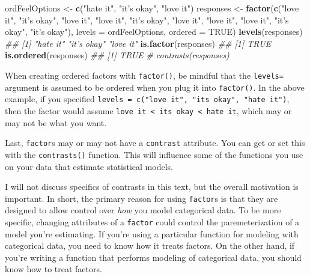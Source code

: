 \documentclass[12pt,krantz2]{krantz}
\makeatletter
\newenvironment{Shaded}{\begin{snugshade}}{\end{snugshade}}
\newcommand{\CommentTok}[1]{\textcolor[rgb]{0.37,0.37,0.37}{\textit{#1}}}
\newcommand{\DataTypeTok}[1]{\textcolor[rgb]{0.27,0.27,0.27}{#1}}
\newcommand{\KeywordTok}[1]{\textcolor[rgb]{0.27,0.27,0.27}{\textbf{#1}}}
\newcommand{\NormalTok}[1]{#1}
\newcommand{\OtherTok}[1]{\textcolor[rgb]{0.37,0.37,0.37}{#1}}
\newcommand{\StringTok}[1]{\textcolor[rgb]{0.5,0.5,0.5}{#1}}
\newenvironment{kframe}{%
\medskip{}
\setlength{\fboxsep}{.8em}
 \def\at@end@of@kframe{}%
 \ifinner\ifhmode%
  \def\at@end@of@kframe{\end{minipage}}%
  \begin{minipage}{\columnwidth}%
 \fi\fi%
 \def\FrameCommand##1{\hskip\@totalleftmargin \hskip-\fboxsep
 \colorbox{shadecolor}{##1}\hskip-\fboxsep
     \hskip-\linewidth \hskip-\@totalleftmargin \hskip\columnwidth}%
 \MakeFramed {\advance\hsize-\width
   \@totalleftmargin\z@ \linewidth\hsize
   \@setminipage}}%
 {\par\unskip\endMakeFramed%
 \at@end@of@kframe}
\renewenvironment{Shaded}{\begin{kframe}}{\end{kframe}}
\makeatother
\begin{document}
\begin{Shaded}
\begin{Highlighting}[]
\NormalTok{ordFeelOptions <-}\StringTok{ }\KeywordTok{c}\NormalTok{(}\StringTok{"hate it"}\NormalTok{, }\StringTok{"it's okay"}\NormalTok{, }\StringTok{"love it"}\NormalTok{)}
\NormalTok{responses <-}\StringTok{ }\KeywordTok{factor}\NormalTok{(}\KeywordTok{c}\NormalTok{(}\StringTok{"love it"}\NormalTok{, }\StringTok{"it's okay"}\NormalTok{, }\StringTok{"love it"}\NormalTok{, }
                      \StringTok{"love it"}\NormalTok{, }\StringTok{"it's okay"}\NormalTok{, }\StringTok{"love it"}\NormalTok{, }
                      \StringTok{"love it"}\NormalTok{, }\StringTok{"love it"}\NormalTok{, }\StringTok{"it's okay"}\NormalTok{, }
                      \StringTok{"it's okay"}\NormalTok{), }
                    \DataTypeTok{levels =}\NormalTok{ ordFeelOptions,}
                    \DataTypeTok{ordered =} \OtherTok{TRUE}\NormalTok{)}
\KeywordTok{levels}\NormalTok{(responses)}
\CommentTok{## [1] "hate it"   "it's okay" "love it"}
\KeywordTok{is.factor}\NormalTok{(responses)}
\CommentTok{## [1] TRUE}
\KeywordTok{is.ordered}\NormalTok{(responses)}
\CommentTok{## [1] TRUE}
\CommentTok{# contrasts(responses)}
\end{Highlighting}
\end{Shaded}

\begin{rmd-caution}
When creating ordered factors with \texttt{factor()}, be mindful that the \texttt{levels=} argument is assumed to be ordered when you plug it into \texttt{factor()}. In the above example, if you specified \texttt{levels\ =\ c("love\ it",\ "it\textquotesingle{}s\ okay",\ "hate\ it")}, then the factor would assume \texttt{love\ it\ \textless{}\ it\textquotesingle{}s\ okay\ \textless{}\ hate\ it}, which may or may not be what you want.

\end{rmd-caution}

Last, \texttt{factor}s may or may not have a \texttt{contrast} attribute. You can get or set this with the \texttt{contrasts()} function. This will influence some of the functions you use on your data that estimate statistical models.

I will not discuss specifics of contrasts in this text, but the overall motivation is important. In short, the primary reason for using \texttt{factor}s is that they are designed to allow control over \emph{how} you model categorical data. To be more specific, changing attributes of a \texttt{factor} could control the paremeterization of a model you're estimating. If you're using a particular function for modeling with categorical data, you need to know how it treats factors. On the other hand, if you're writing a function that performs modeling of categorical data, you should know how to treat factors.
\end{document}
